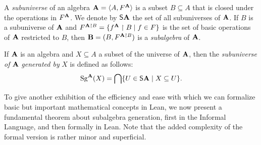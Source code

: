 \documentclass[12pt]{amsart}  %
\begin{document}

A \emph{subuniverse} of an algebra $\mathbf{A} = \langle A, F^{\mathbf{A}}\rangle$ is a subset $B \subseteq A$
that is closed under the operations in $F^{\mathbf{A}}$.  
We denote by $\mathsf{S} \mathbf{A}$ the set of all subuniverses of $\mathbf{A}$.
If $B$ is a subuniverse of $\mathbf{A}$ and 
$F^{\mathbf{A} \upharpoonright B} = \{f^{\mathbf{A}} \upharpoonright B \mid f \in F\}$ is the set of 
basic operations of $\mathbf{A}$ restricted to $B$, 
then $\mathbf{B} = (B, F^{\mathbf{A} \upharpoonright B})$ is a \emph{subalgebra} of $\mathbf{A}$.

If $\mathbf{A}$ is an algebra and $X  \subseteq  A$ a subset of the 
universe of $\mathbf{A}$, then the \emph{subuniverse of} $\mathbf{A}$ 
\emph{generated by}  $X$ is defined as follows:
\begin{equation}
  \label{eq:SgDef}
\operatorname{Sg}^{\mathbf{A}}(X)  =  \bigcap \{U \in  \mathsf{S} \mathbf{A} \mid  X  \subseteq  U\}.
\end{equation}

To give another exhibition of the efficiency and ease with which we can formalize basic but important mathematical concepts in Lean, we now present a fundamental theorem about 
subalgebra generation, first in the Informal Language, and then formally in Lean.
Note that the added complexity of the formal version is rather minor and superficial.
\end{document}

